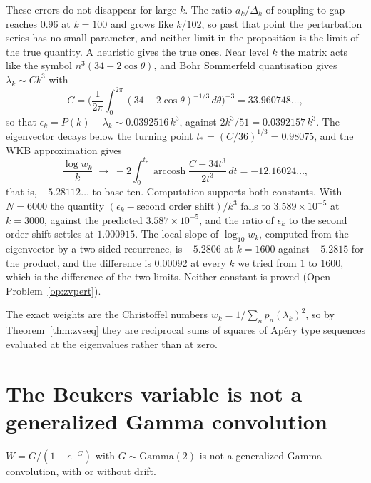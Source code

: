 These errors do not disappear for large $k$. The ratio $a_k/\Delta_k$ of coupling to gap reaches $0.96$ at $k=100$ and grows like $k/102$, so past that point the perturbation series has no small parameter, and neither limit in the proposition is the limit of the true quantity. A heuristic gives the true ones. Near level $k$ the matrix acts like the symbol $n^3(34-2\cos\theta)$, and Bohr Sommerfeld quantisation gives $\lambda_k\sim Ck^3$ with
\[
C=\Big(\frac1{2\pi}\int_0^{2\pi}(34-2\cos\theta)^{-1/3}\,d\theta\Big)^{-3}=33.960748\ldots,
\]
so that $\epsilon_k=P(k)-\lambda_k\sim0.0392516\,k^3$, against $2k^3/51=0.0392157\,k^3$. The eigenvector decays below the turning point $t_*=(C/36)^{1/3}=0.98075$, and the WKB approximation gives
\[
\frac{\log w_k}{k}\;\longrightarrow\;-2\int_0^{t_*}\operatorname{arccosh}\frac{C-34t^3}{2t^3}\,dt=-12.16024\ldots,
\]
that is, $-5.28112\ldots$ to base ten. Computation supports both constants. With $N=6000$ the quantity $(\epsilon_k-\text{second order shift})/k^3$ falls to $3.589\times10^{-5}$ at $k=3000$, against the predicted $3.587\times10^{-5}$, and the ratio of $\epsilon_k$ to the second order shift settles at $1.000915$. The local slope of $\log_{10}w_k$, computed from the eigenvector by a two sided recurrence, is $-5.2806$ at $k=1600$ against $-5.2815$ for the product, and the difference is $0.00092$ at every $k$ we tried from $1$ to $1600$, which is the difference of the two limits. Neither constant is proved (Open Problem~\ref{op:zvpert}).

The exact weights are the Christoffel numbers $w_k=1/\sum_np_n(\lambda_k)^2$, so by Theorem~\ref{thm:zvseq} they are reciprocal sums of squares of Ap\'ery type sequences evaluated at the eigenvalues rather than at zero.

\section{The Beukers variable is not a generalized Gamma convolution}

\begin{theorem}\label{thm:zvWnot}
$W=G/(1-e^{-G})$ with $G\sim\mathrm{Gamma}(2)$ is not a generalized Gamma convolution, with or without drift.
\end{theorem}

